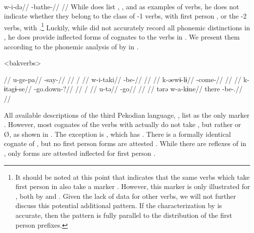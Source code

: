\bakairi \parencite[][4]{meira2003bakairi}\\
\begingl
\gla w-i-də//
\glb {}-bathe-//
\glft {}//
\endgl
\xe
%
While \textcite[4]{meira2003bakairi} does list  ,  , and   as examples of  verbs, he does not indicate whether they belong to the class of -1 verbs, with first person , or the -2 verbs, with .\footnote{It should be noted at this point that \textcite{meira2003bakairi} indicates that the same verbs which take first person  in \bakairi also take a  marker . However, this marker is only illustrated for , both by \textcite{meira2003bakairi} and \textcite{von1892bakairi}. Given the lack of data for other verbs, we will not further discuss this potential additional pattern. If the characterization by \citeauthor{meira2003bakairi} is accurate, then the pattern is fully parallel to the distribution of the first person prefixes.}
Luckily, while \textcite{von1892bakairi} did not accurately record all phonemic distinctions in \bakairi \parencite{meira2005bakairi}, he does provide inflected forms of cognates to the \arara verbs in .
We present them according to the phonemic analysis of \bakairi by \textcites{wheatley1969bakairi}{meira2003bakairi}{meira2005bakairi} in .

\pex[everyglpreamble=]<bakverbs> \bakairi \parencite[][131, 397, 76, 137, 374, 130]{von1892bakairi}
\begin{multicols}{2}
\begingl
\glpreamble {} //
\gla u-ge-pa//
\glb {}-say-//
\glft {}//
\endgl
{}
\begingl
\glpreamble {} /  //
\gla w-i-taki//
\glb {}-be-//
\glft {}//
\endgl
{}
\begingl
\glpreamble {} //
\gla k-əewɨ-lɨ//
\glb {}-come-//
\glft {}//
\endgl
{}
\begingl
\glpreamble {} //
\gla k-ɨtəgɨ-se//
\glb {}-go.down-?//
\glft {}//
\endgl
{}
\begingl
\glpreamble {} / //
\gla u-tə//
\glb {}-go//
\glft {}//
\endgl
{}
\begingl
\glpreamble {}//
\gla tərə w-a-kɨne//
\glb there -be-.//
\glft {}//
\endgl
\end{multicols}
\xe

All available descriptions of the third Pekodian language, \ikpeng, list  as the only  marker \parencites[55]{ikpengpacheco1997}[105]{campetela1997analise}[64]{ikpengpacheco2001}[205]{alves2013verbo}.
However, most \ikpeng cognates of the \arara verbs with   actually do not take , but rather  or Ø, as shown in .
The exception is , which has  .
There is a formally identical \ikpeng cognate of \arara {} , but no first person forms are attested .
While there are reflexes of   in \ikpeng, only  forms are attested inflected for first person \parencite[401]{gildea2018reconstructing}.

